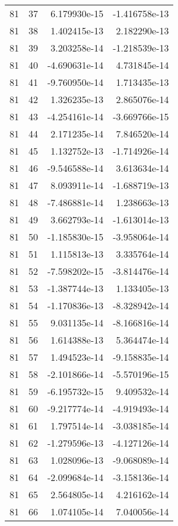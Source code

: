 \begin{tabular}{rrrr}
  81 &   37 &  6.179930e-15 & -1.416758e-13 \\
  81 &   38 &  1.402415e-13 &  2.182290e-13 \\
  81 &   39 &  3.203258e-14 & -1.218539e-13 \\
  81 &   40 & -4.690631e-14 &  4.731845e-14 \\
  81 &   41 & -9.760950e-14 &  1.713435e-13 \\
  81 &   42 &  1.326235e-13 &  2.865076e-14 \\
  81 &   43 & -4.254161e-14 & -3.669766e-15 \\
  81 &   44 &  2.171235e-14 &  7.846520e-14 \\
  81 &   45 &  1.132752e-13 & -1.714926e-14 \\
  81 &   46 & -9.546588e-14 &  3.613634e-14 \\
  81 &   47 &  8.093911e-14 & -1.688719e-13 \\
  81 &   48 & -7.486881e-14 &  1.238663e-13 \\
  81 &   49 &  3.662793e-14 & -1.613014e-13 \\
  81 &   50 & -1.185830e-15 & -3.958064e-14 \\
  81 &   51 &  1.115813e-13 &  3.335764e-14 \\
  81 &   52 & -7.598202e-15 & -3.814476e-14 \\
  81 &   53 & -1.387744e-13 &  1.133405e-13 \\
  81 &   54 & -1.170836e-13 & -8.328942e-14 \\
  81 &   55 &  9.031135e-14 & -8.166816e-14 \\
  81 &   56 &  1.614388e-13 &  5.364474e-14 \\
  81 &   57 &  1.494523e-14 & -9.158835e-14 \\
  81 &   58 & -2.101866e-14 & -5.570196e-15 \\
  81 &   59 & -6.195732e-15 &  9.409532e-14 \\
  81 &   60 & -9.217774e-14 & -4.919493e-14 \\
  81 &   61 &  1.797514e-14 & -3.038185e-14 \\
  81 &   62 & -1.279596e-13 & -4.127126e-14 \\
  81 &   63 &  1.028096e-13 & -9.068089e-14 \\
  81 &   64 & -2.099684e-14 & -3.158136e-14 \\
  81 &   65 &  2.564805e-14 &  4.216162e-14 \\
  81 &   66 &  1.074105e-14 &  7.040056e-14 \\

\end{tabular}
